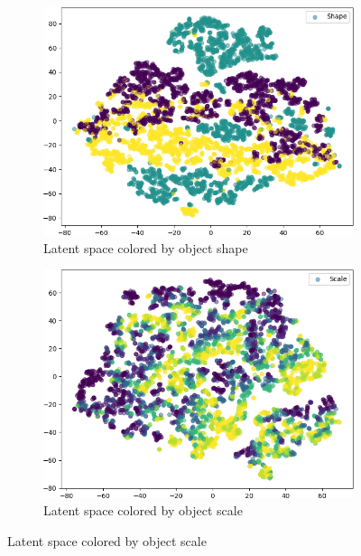 \begin{figure}
    \centering
    \begin{adjustbox}{valign=T}
        \begin{subfigure}{.19\textwidth}
            \includegraphics[width=\textwidth]{images/latent_spaces/dsprites/vae/embeddings_mu_0.png}
            \caption{Latent space colored by object shape}
        \end{subfigure}
    \end{adjustbox}
    \hfill
    \begin{adjustbox}{valign=T}
        \begin{subfigure}{.19\textwidth}
            \includegraphics[width=\textwidth]{images/latent_spaces/dsprites/vae/embeddings_mu_1.png}
            \caption{Latent space colored by object scale}

\end{subfigure}
\end{adjustbox}
\end{figure}
